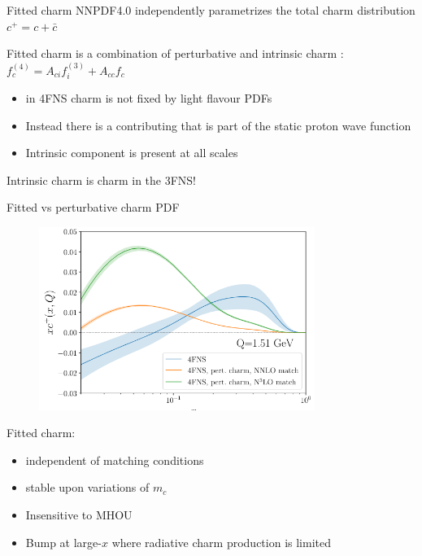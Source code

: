 \documentclass[aspectratio=43, 8pt,t]{beamer}
\begin{document}
\begin{frame}{Fitted charm}
  NNPDF4.0 independently parametrizes the total charm distribution $c^+=c+\bar{c}$

  \vspace*{1em}
  Fitted charm is a combination of perturbative and intrinsic charm : \\
  $f_c^{(4)} = A_{ci}f_i^{(3)}+A_{cc}f_c^{}$
  \begin{itemize}
    \item in 4FNS charm is not fixed by light flavour PDFs
    \item Instead there is a contributing that is part of the static proton wave function
    \item Intrinsic component is present at all scales
  \end{itemize}

  \vspace*{1em}
  Intrinsic charm is charm in the 3FNS!
\end{frame}

\begin{frame}{Fitted vs perturbative charm PDF}
  \begin{figure}
    \includegraphics[width=0.8\textwidth]{fitted_vs_perturbative_pdf.png}
  \end{figure}

  Fitted charm:
  \begin{itemize}
    \item independent of matching conditions
    \item stable upon variations of $m_c$
    \item Insensitive to MHOU
    \item Bump at large-$x$ where radiative charm production is limited
  \end{itemize}
\end{frame}
\end{document}
